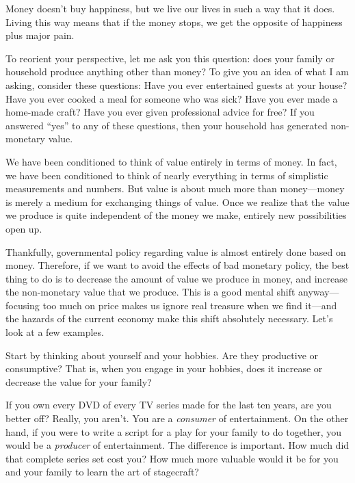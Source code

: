 \documentclass[letterpaper]{article}
\begin{document}
{\color{black}
 Money doesn’t buy happiness, but we live our lives in such a way that
it does. Living this way means that
\textcolor[rgb]{0.32941177,0.5529412,0.83137256}{if the money }stops,
we get\textcolor[rgb]{0.32941177,0.5529412,0.83137256}{ the opposite of
happiness plus} major pain. }

{\color{black}
To reorient your perspective, let me ask you this question: does your
family or household produce anything other than money?  To give you an
idea of what I am asking, consider these questions: Have you ever
entertained guests at your house?  Have you ever cooked a meal for
someone who was sick?  Have you ever made a home-made craft?  Have you
ever given professional advice for free?  If you answered “yes” to any
of these questions, then your household has generated non-monetary
value. }

{\color{black}
We have been conditioned to think of value entirely in terms of money.
In fact, we have been conditioned to think of nearly everything in
terms of simplistic measurements and numbers. But value is about much
more than money—money is merely a medium for exchanging things of
value. Once we realize that the value we produce is quite independent
of the money we make, entirely new possibilities open up.}

{\color{black}
Thankfully, governmental policy regarding value is almost entirely done
based on money. Therefore, if we want to avoid the effects of bad
monetary policy, the best thing to do is to decrease the amount of
value we produce in money, and increase the non-monetary value that we
produce. This is a good mental shift anyway—focusing too much on price
makes us ignore real treasure when we find it—and the hazards of the
current economy make this shift absolutely necessary.
\textcolor[rgb]{0.32941177,0.5529412,0.83137256}{Let’s look at a few
examples. }}

{\color{black}
Start by thinking about yourself and your hobbies. Are they productive
or consumptive?  That is, when you engage in your hobbies, does it
increase or decrease the value for your family? }

{\color{black}
If you own every DVD of every TV series made for the last ten years, are
you better off?  Really, you aren’t. You are a \textit{consumer} of
entertainment. On the other hand, if you were to write a script for a
play for your family to do together, you would be a \textit{producer}
of entertainment. The difference is important. How much did that
complete series set cost you?  How much more valuable would it be for
you and your family to learn the art of stagecraft? }
\end{document}

